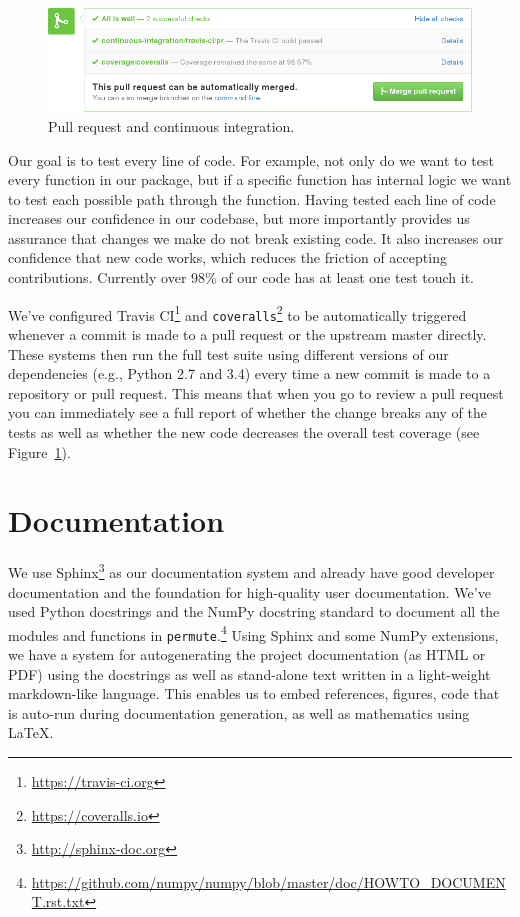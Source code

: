 \begin{figure}
  \begin{centering}
    \includegraphics[width=\textwidth]{fig/pull-request-ci.png}\par
  \end{centering}

  \caption{\label{fig:pull-request}Pull request and continuous integration.}
\end{figure}

Our goal is to test every line of code.  For example, not only do we want to
test every function in our package, but if a specific function has internal
logic we want to test each possible path through the function.  Having tested
each line of code increases our confidence in our codebase, but more
importantly provides us assurance that changes we make do not break existing
code.  It also increases our confidence that new code works, which reduces the
friction of accepting contributions.  Currently over 98\% of our code has at
least one test touch it.

We've configured Travis CI\footnote{\url{https://travis-ci.org}} and
\texttt{coveralls}\footnote{\url{https://coveralls.io}} to be automatically
triggered whenever a commit is made to a pull request or the upstream
master directly.  These systems then run the full test suite 
using different versions of our dependencies (e.g., Python 2.7 and 3.4) 
every time a
new commit is made to a repository or pull request.
This means that when you go to review a pull request you can immediately see
a full report of whether the change breaks any of the tests as well as whether
the new code decreases the overall test coverage (see Figure~\ref{fig:pull-request}).

\section{\label{sec:doc}Documentation}

We use Sphinx\footnote{\url{http://sphinx-doc.org}} as our documentation system
and already have good developer documentation and the foundation for
high-quality user documentation. We've used Python docstrings and the NumPy
docstring standard to document all the modules and functions in
\texttt{permute}.\footnote{\url{https://github.com/numpy/numpy/blob/master/doc/HOWTO\_DOCUMENT.rst.txt}}
Using Sphinx and some NumPy extensions, we have a system for autogenerating the
project documentation (as HTML or PDF) using the docstrings as well as
stand-alone text written in a light-weight markdown-like language.  This
enables us to embed references, figures, code that is auto-run during
documentation generation, as well as mathematics using \LaTeX.

